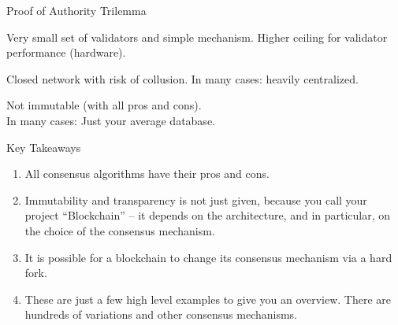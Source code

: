 \documentclass[]{beamer}
\begin{document}
	\begin{frame}{Proof of Authority Trilemma}
		\begin{center}
			\begin{tikzpicture}[scale=0.6, every node/.style ={scale=0.8}]
				
			\end{tikzpicture}
		\end{center}
		
		\begin{description}[labelwidth=10em]
			\item[\textbf{Scalability}] Very small set of validators and simple mechanism. Higher ceiling for validator performance (hardware).
			\item[\textbf{Decentralization}] Closed network with risk of collusion. In many cases: heavily centralized. 
			\item[\textbf{Security}] Not immutable (with all pros and cons).\\ In many cases: Just your average database.
		\end{description}
	\end{frame}
	
	\begin{frame}{Key Takeaways}
		\begin{enumerate}
			\item All consensus algorithms have their pros and cons. 
			\item<2-> Immutability and transparency is not just given, because you call your project ``Blockchain'' -- it depends on the architecture, and in particular, on the choice of the consensus mechanism.
			\item<3-> It is possible for a blockchain to change its consensus mechanism via a hard fork.	
			\item<4-> These are just a few high level examples to give you an overview. There are hundreds of variations and other consensus mechanisms.
		\end{enumerate}
	\end{frame}
	
\end{document}
